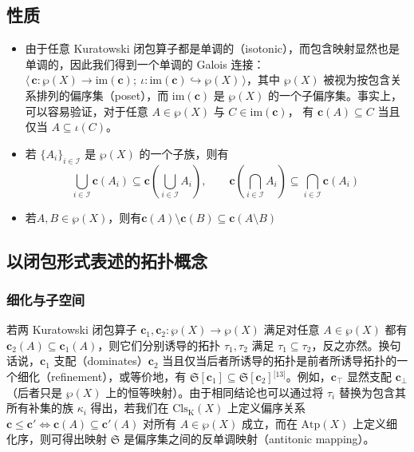 \subsection{性质}
\begin{itemize}
\item 由于任意 Kuratowski 闭包算子都是单调的（isotonic），而包含映射显然也是单调的，因此我们得到一个单调的 Galois 连接：$\langle\, \mathbf{c} : \wp(X) \to \mathrm{im}(\mathbf{c});\ \iota : \mathrm{im}(\mathbf{c})\hookrightarrow \wp(X) \,\rangle$，其中 $\wp(X)$ 被视为按包含关系排列的偏序集（poset），而 $\mathrm{im}(\mathbf{c})$ 是 $\wp(X)$ 的一个子偏序集。事实上，可以容易验证，对于任意 $A \in \wp(X)$ 与 $C \in \mathrm{im}(\mathbf{c})$，
有 $\mathbf{c}(A) \subseteq C$ 当且仅当 $A \subseteq \iota(C)$。
\item 若 $\{A_{i}\}_{i \in \mathcal{I}}$ 是 $\wp(X)$ 的一个子族，则有
\[
\bigcup_{i \in \mathcal{I}} \mathbf{c}(A_{i})
\subseteq
\mathbf{c}\!\left( \bigcup_{i \in \mathcal{I}} A_{i} \right),
\qquad
\mathbf{c}\!\left( \bigcap_{i \in \mathcal{I}} A_{i} \right)
\subseteq
\bigcap_{i \in \mathcal{I}} \mathbf{c}(A_{i})~
\]
\item 若$A,B \in \wp(X)$，则有$\mathbf{c}(A) \setminus \mathbf{c}(B) \subseteq \mathbf{c}(A \setminus B)$
\end{itemize}
\subsection{以闭包形式表述的拓扑概念}
\subsubsection{细化与子空间}
若两 Kuratowski 闭包算子 $\mathbf{c}_{1}, \mathbf{c}_{2} : \wp(X) \to \wp(X)$ 满足对任意 $A \in \wp(X)$ 都有 $\mathbf{c}_{2}(A) \subseteq \mathbf{c}_{1}(A)$，则它们分别诱导的拓扑 $\tau_{1}, \tau_{2}$ 满足 $\tau_{1} \subseteq \tau_{2}$，反之亦然。换句话说，$\mathbf{c}_{1}$ 支配（dominates）$\mathbf{c}_{2}$ 当且仅当后者所诱导的拓扑是前者所诱导拓扑的一个细化（refinement），或等价地，有 ${\mathfrak{S}}[\mathbf{c}_{1}] \subseteq {\mathfrak{S}}[\mathbf{c}_{2}]$\(^\text{[13]}\)。例如，$\mathbf{c}_{\top}$ 显然支配 $\mathbf{c}_{\bot}$（后者只是 $\wp(X)$ 上的恒等映射）。由于相同结论也可以通过将 $\tau_{i}$ 替换为包含其所有补集的族 $\kappa_{i}$ 得出，若我们在 $\mathrm{Cls}_{\text{K}}(X)$ 上定义偏序关系$\mathbf{c} \leq \mathbf{c}' \iff \mathbf{c}(A) \subseteq \mathbf{c}'(A)$ 对所有 $A \in \wp(X)$ 成立，而在 $\mathrm{Atp}(X)$ 上定义细化序，则可得出映射 ${\mathfrak{S}}$ 是偏序集之间的反单调映射（antitonic mapping）。

